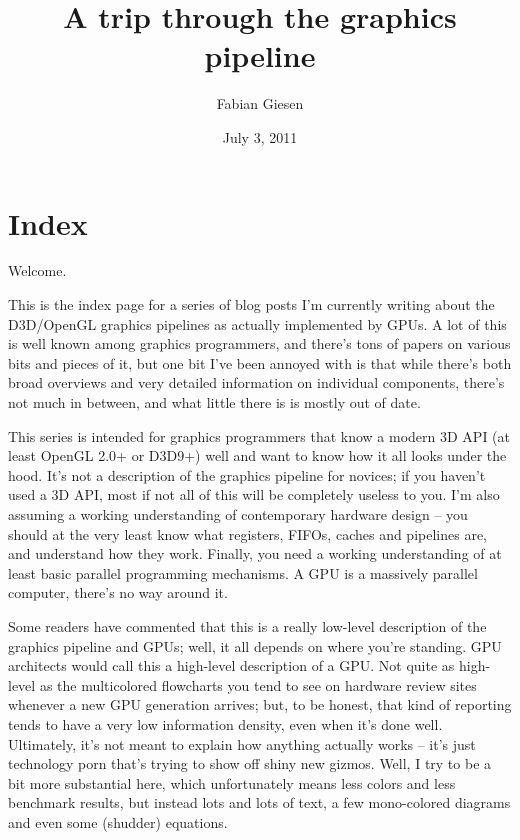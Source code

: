 \documentclass[12pt]{article}
\author{Fabian Giesen}
\date{July 3, 2011}
\title{A trip through the graphics pipeline}
\begin{document}
\maketitle
\setcounter{tocdepth}{2}
\tableofcontents


\section{Index}
\label{sec:orgca26443}

Welcome.

This is the index page for a series of blog posts I’m currently writing about the D3D/OpenGL graphics pipelines as actually implemented by GPUs.
A lot of this is well known among graphics programmers, and there’s tons of papers on various bits and pieces of it, but one bit I’ve been annoyed with is that while there’s both broad overviews and very detailed information on individual components, there’s not much in between, and what little there is is mostly out of date.


This series is intended for graphics programmers that know a modern 3D API (at least OpenGL 2.0+ or D3D9+) well and want to know how it all looks under the hood.
It’s not a description of the graphics pipeline for novices; if you haven’t used a 3D API, most if not all of this will be completely useless to you.
I’m also assuming a working understanding of contemporary hardware design – you should at the very least know what registers, FIFOs, caches and pipelines are, and understand how they work.
Finally, you need a working understanding of at least basic parallel programming mechanisms.
A GPU is a massively parallel computer, there’s no way around it.


Some readers have commented that this is a really low-level description of the graphics pipeline and GPUs; well, it all depends on where you’re standing.
GPU architects would call this a high-level description of a GPU.
Not quite as high-level as the multicolored flowcharts you tend to see on hardware review sites whenever a new GPU generation arrives; but, to be honest, that kind of reporting tends to have a very low information density, even when it’s done well.
Ultimately, it’s not meant to explain how anything actually works – it’s just technology porn that’s trying to show off shiny new gizmos.
Well, I try to be a bit more substantial here, which unfortunately means less colors and less benchmark results, but instead lots and lots of text, a few mono-colored diagrams and even some (shudder) equations.
\end{document}
